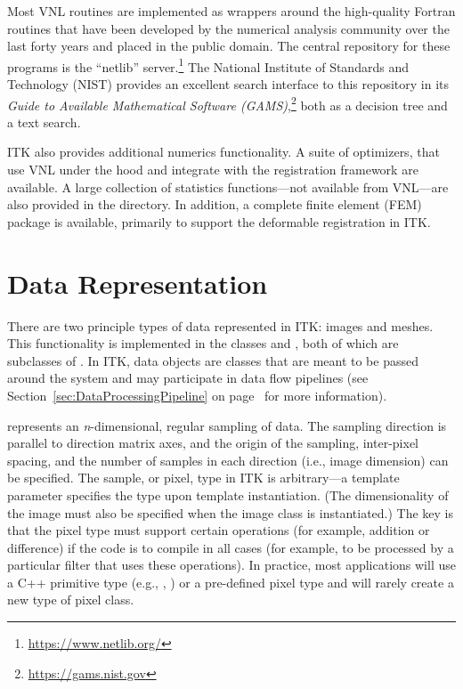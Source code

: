 Most VNL routines are implemented as wrappers around the high-quality Fortran
routines that have been developed by the numerical analysis community over
the last forty years and placed in the public domain. The central repository
for these programs is the ``netlib'' server.\footnote{\url{https://www.netlib.org/}} The
National Institute of Standards and Technology (NIST) provides an excellent
search interface to this repository in its \emph{Guide to Available Mathematical
Software (GAMS)},\footnote{\url{https://gams.nist.gov}} both as a decision tree and a
text search.

ITK also provides additional numerics functionality. A suite of optimizers, that
use VNL under the hood and integrate with the registration framework
are available. A large collection of statistics functions---not available from
VNL---are also provided in the 
directory. In addition, a complete finite element (FEM) package is available,
primarily to support the deformable registration in ITK.


\section{Data Representation}
\label{sec:DataRepresentationAndAccess}


There are two principle types of data represented in ITK: images and
meshes. This functionality is implemented in the classes
 and , both of which are subclasses of
. In ITK, data objects are classes that are meant to
be passed around the system and may participate in data flow pipelines (see
Section~\ref{sec:DataProcessingPipeline} on
page~\pageref{sec:DataProcessingPipeline} for more information).



 represents an \emph{n}-dimensional, regular sampling of
data. The sampling direction is parallel to direction matrix axes, and
the origin of the sampling, inter-pixel spacing, and the number of samples in
each direction (i.e., image dimension) can be specified. The sample, or
pixel, type in ITK is arbitrary---a template parameter 
specifies the type upon template instantiation. (The dimensionality of the
image must also be specified when the image class is instantiated.) The key
is that the pixel type must support certain operations (for example, addition
or difference) if the code is to compile in all cases (for example, to be
processed by a particular filter that uses these operations). In practice,
most applications will use a C++ primitive type (e.g., , )
or a pre-defined pixel type and will rarely create a new type of pixel class.

